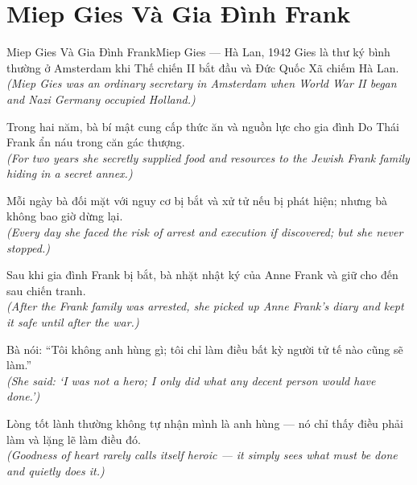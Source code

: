 \section{Miep Gies Và Gia Đình Frank}
\begin{truyen}{Miep Gies Và Gia Đình Frank}{Miep Gies --- Hà Lan, 1942}
 Gies là thư ký bình thường ở Amsterdam khi Thế chiến II bắt đầu và Đức Quốc Xã chiếm Hà Lan.\\[4pt]
\textit{(Miep Gies was an ordinary secretary in Amsterdam when World War II began and Nazi Germany occupied Holland.)}

Trong hai năm, bà bí mật cung cấp thức ăn và nguồn lực cho gia đình Do Thái Frank ẩn náu trong căn gác thượng.\\[4pt]
\textit{(For two years she secretly supplied food and resources to the Jewish Frank family hiding in a secret annex.)}

Mỗi ngày bà đối mặt với nguy cơ bị bắt và xử tử nếu bị phát hiện; nhưng bà không bao giờ dừng lại.\\[4pt]
\textit{(Every day she faced the risk of arrest and execution if discovered; but she never stopped.)}

Sau khi gia đình Frank bị bắt, bà nhặt nhật ký của Anne Frank và giữ cho đến sau chiến tranh.\\[4pt]
\textit{(After the Frank family was arrested, she picked up Anne Frank's diary and kept it safe until after the war.)}

Bà nói: ``Tôi không anh hùng gì; tôi chỉ làm điều bất kỳ người tử tế nào cũng sẽ làm.''\\[4pt]
\textit{(She said: `I was not a hero; I only did what any decent person would have done.')}

\end{truyen}
\begin{baihoc}
  Lòng tốt lành thường không tự nhận mình là anh hùng --- nó chỉ thấy điều phải làm và lặng lẽ làm điều đó.\\[4pt]
  \textit{(Goodness of heart rarely calls itself heroic --- it simply sees what must be done and quietly does it.)}
\end{baihoc}

